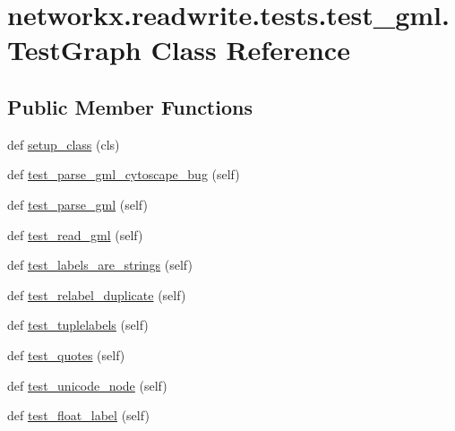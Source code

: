 \hypertarget{classnetworkx_1_1readwrite_1_1tests_1_1test__gml_1_1TestGraph}{}\section{networkx.\+readwrite.\+tests.\+test\+\_\+gml.\+Test\+Graph Class Reference}
\label{classnetworkx_1_1readwrite_1_1tests_1_1test__gml_1_1TestGraph}
\subsection*{Public Member Functions}
\begin{DoxyCompactItemize}
\item 
def \hyperlink{classnetworkx_1_1readwrite_1_1tests_1_1test__gml_1_1TestGraph_ad4adf1f43630550390d691f5f97193db}{setup\+\_\+class} (cls)
\item 
def \hyperlink{classnetworkx_1_1readwrite_1_1tests_1_1test__gml_1_1TestGraph_acb771e8318fa668aae66a67eda605ba3}{test\+\_\+parse\+\_\+gml\+\_\+cytoscape\+\_\+bug} (self)
\item 
def \hyperlink{classnetworkx_1_1readwrite_1_1tests_1_1test__gml_1_1TestGraph_ac551079552cc6010ad903e6007309855}{test\+\_\+parse\+\_\+gml} (self)
\item 
def \hyperlink{classnetworkx_1_1readwrite_1_1tests_1_1test__gml_1_1TestGraph_aae86f2f4e5eb8c8654516bf0fb6e6df2}{test\+\_\+read\+\_\+gml} (self)
\item 
def \hyperlink{classnetworkx_1_1readwrite_1_1tests_1_1test__gml_1_1TestGraph_a1e1454ed13c919a253eb31cf1f0e7f7b}{test\+\_\+labels\+\_\+are\+\_\+strings} (self)
\item 
def \hyperlink{classnetworkx_1_1readwrite_1_1tests_1_1test__gml_1_1TestGraph_a11d35ade9abe0b5b3deedb8b7b72c09b}{test\+\_\+relabel\+\_\+duplicate} (self)
\item 
def \hyperlink{classnetworkx_1_1readwrite_1_1tests_1_1test__gml_1_1TestGraph_a1673f69e9bb1adc954ca2bd44367519b}{test\+\_\+tuplelabels} (self)
\item 
def \hyperlink{classnetworkx_1_1readwrite_1_1tests_1_1test__gml_1_1TestGraph_a575f1186c332e3f32ae0dd6163ba0937}{test\+\_\+quotes} (self)
\item 
def \hyperlink{classnetworkx_1_1readwrite_1_1tests_1_1test__gml_1_1TestGraph_a153135a9f023544c4ead084154794e12}{test\+\_\+unicode\+\_\+node} (self)
\item 
def \hyperlink{classnetworkx_1_1readwrite_1_1tests_1_1test__gml_1_1TestGraph_a52b0d1ac550f46dc8c39dcf9227b7d53}{test\+\_\+float\+\_\+label} (self)

\end{DoxyCompactItemize}
